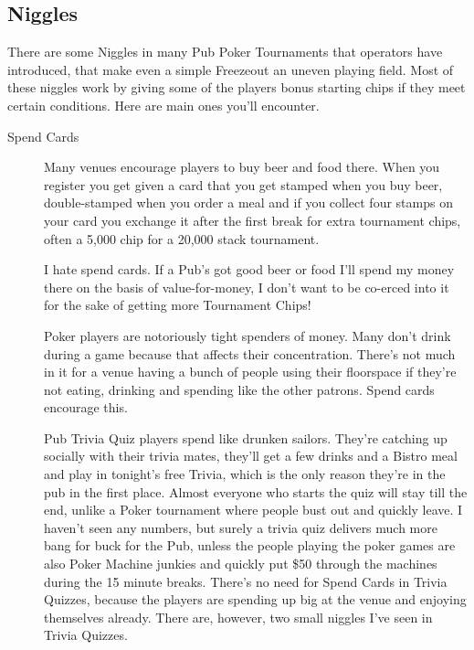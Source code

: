 
\subsection{Niggles}

There are some Niggles in many Pub Poker Tournaments that operators
have introduced, that make even a simple Freezeout an
uneven playing field. Most of these niggles work by giving some
of the players bonus starting chips if they meet certain
conditions. Here are main ones you'll encounter.


\begin{description}

\item[Spend Cards] Many venues encourage players to buy beer and food there.
When you register you get given a card that you get stamped when you
buy beer, double-stamped when you order a meal and if you collect four
stamps on your card you exchange it after the first break for extra
tournament chips, often a 5,000 chip for a 20,000 stack tournament.

I hate spend cards. If a Pub's got good beer or food
I'll spend my money there on the basis of value-for-money, I don't
want to be co-erced into it for the sake of getting more Tournament Chips!

Poker players are notoriously tight spenders of money.
Many don't drink during a game because that affects their concentration.
There's not much in it for a venue having a bunch of people using
their floorspace if they're not eating, drinking and spending like
the other patrons. Spend cards encourage this.

Pub Trivia Quiz players spend like drunken sailors. They're catching
up socially with their trivia mates, they'll get a few drinks and a
Bistro meal and play in tonight's free Trivia, which is the only
reason they're in the pub in the first place. Almost everyone who
starts the quiz will stay till the end, unlike a Poker tournament
where people bust out and quickly leave. I haven't seen any numbers,
but surely a trivia quiz delivers much more bang for buck for the
Pub, unless the people playing the poker games are also Poker Machine
junkies and quickly put \$50 through the machines during the 15 minute
breaks. There's no need for Spend Cards in Trivia Quizzes, because the
players are spending up big at the venue and enjoying themselves already.
There are, however, two small niggles I've seen in Trivia Quizzes.


\end{description}
